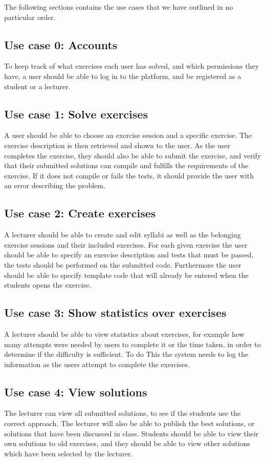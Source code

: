The following sections contains the use cases that we have outlined in no particular order.  
\subsection*{Use case 0: Accounts}
To keep track of what exercises each user has solved, and which permissions they have, a user should be able to log in to the platform, and be registered as a student or a lecturer.

\subsection*{Use case 1: Solve exercises}
A user should be able to choose an exercise session and a specific exercise. The exercise description is then retrieved and shown to the user.
As the user completes the exercise, they should also be able to submit the exercise, and verify that their submitted solutions can compile and fulfills the requirements of the exercise. If it does not compile or fails the tests, it should provide the user with an error describing the problem. 

\subsection*{Use case 2: Create exercises}
A lecturer should be able to create and edit syllabi as well as the belonging exercise sessions and their included exercises. 
For each given exercise the user should be able to specify an exercise description and tests that must be passed, the tests should be performed on the submitted code. Furthermore the user should be able to specify template code that will already be entered when the students opens the exercise.

\subsection*{Use case 3: Show statistics over exercises}
A lecturer should be able to view statistics about exercises, for example how many attempts were needed by users to complete it or the time taken, in order to determine if the difficulty is sufficient. To do This the system needs to log the information as the users attempt to complete the exercises.


\subsection*{Use case 4: View solutions}
The lecturer can view all submitted solutions, to see if the students use the correct approach. The lecturer will also be able to publish the best solutions, or solutions that have been discussed in class.  
Students should be able to view their own solutions to old exercises, and they should be able to view other solutions which have been selected by the lecturer. 


